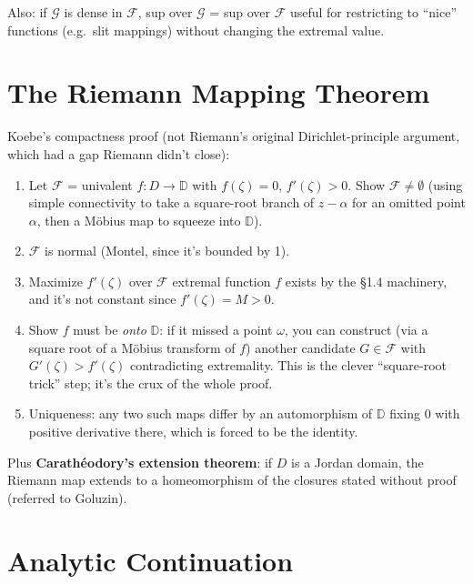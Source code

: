 \documentclass[
]{book}
\providecommand{\tightlist}{%
  \setlength{\itemsep}{0pt}\setlength{\parskip}{0pt}}
\theoremstyle{definition}
\theoremstyle{definition}
\theoremstyle{definition}
\theoremstyle{definition}
\theoremstyle{remark}
\begin{document}
Also: if \(\mathcal{G}\) is dense in \(\mathcal{F}\), sup over \(\mathcal{G}\) = sup over \(\mathcal{F}\) useful for restricting to ``nice'' functions (e.g.~slit mappings) without changing the extremal value.

\section{The Riemann Mapping Theorem}\label{the-riemann-mapping-theorem}

Koebe's compactness proof (not Riemann's original Dirichlet-principle argument, which had a gap Riemann didn't close):

\begin{enumerate}
\def\labelenumi{\arabic{enumi}.}
\tightlist
\item
  Let \(\mathcal{F}\) = univalent \(f:D\to\mathbb{D}\) with \(f(\zeta)=0\), \(f'(\zeta)>0\). Show \(\mathcal{F}\ne\emptyset\) (using simple connectivity to take a square-root branch of \(z-\alpha\) for an omitted point \(\alpha\), then a Möbius map to squeeze into \(\mathbb{D}\)).
\item
  \(\mathcal{F}\) is normal (Montel, since it's bounded by 1).
\item
  Maximize \(f'(\zeta)\) over \(\mathcal{F}\) extremal function \(f\) exists by the §1.4 machinery, and it's not constant since \(f'(\zeta)=M>0\).
\item
  Show \(f\) must be \emph{onto} \(\mathbb{D}\): if it missed a point \(\omega\), you can construct (via a square root of a Möbius transform of \(f\)) another candidate \(G\in\mathcal{F}\) with \(G'(\zeta) > f'(\zeta)\) contradicting extremality. This is the clever ``square-root trick'' step; it's the crux of the whole proof.
\item
  Uniqueness: any two such maps differ by an automorphism of \(\mathbb{D}\) fixing \(0\) with positive derivative there, which is forced to be the identity.
\end{enumerate}

Plus \textbf{Carathéodory's extension theorem}: if \(D\) is a Jordan domain, the Riemann map extends to a homeomorphism of the closures stated without proof (referred to Goluzin).

\section{Analytic Continuation}\label{analytic-continuation}
\end{document}
